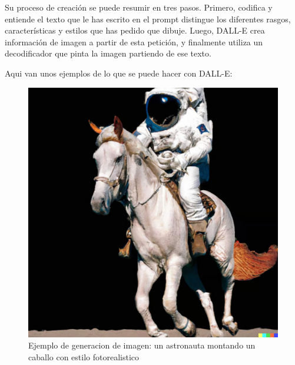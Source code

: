 \documentclass[runningheads]{llncs} %
\begin{document}
Su proceso de creación se puede resumir en tres pasos. 
Primero, codifica y entiende el texto que le has escrito en el prompt 
distingue los diferentes rasgos, características y estilos que has pedido que dibuje.
Luego, DALL-E crea información de imagen a partir de esta petición, y finalmente 
utiliza un decodificador que pinta la imagen partiendo de ese texto. \cite{dalle-xtaka}

Aqui van unos ejemplos de lo que se puede hacer con DALL-E:

\begin{figure}
    \centering
    \includegraphics[scale=0.19]{ej1-dalle.jpg}
    \caption{Ejemplo de generacion de imagen: un astronauta montando un
    caballo con estilo fotorealistico \cite{ej-dalle}}
    \label{fig:dalle-ej1}
\end{figure}
\end{document}

